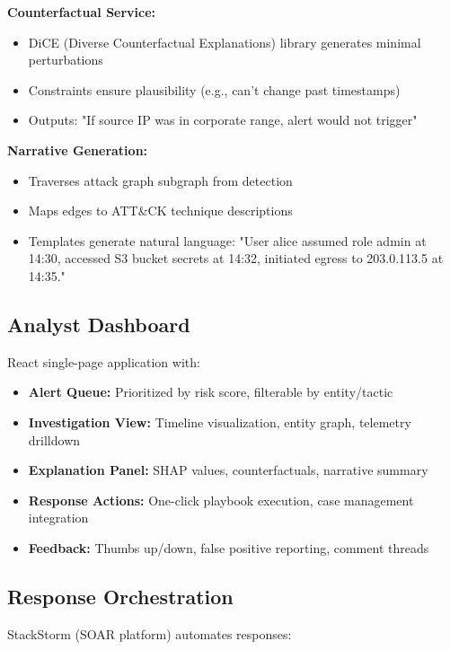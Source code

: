 \textbf{Counterfactual Service:}
\begin{itemize}
    \item DiCE (Diverse Counterfactual Explanations) library generates minimal perturbations
    \item Constraints ensure plausibility (e.g., can't change past timestamps)
    \item Outputs: "If source IP was in corporate range, alert would not trigger"
\end{itemize}

\textbf{Narrative Generation:}
\begin{itemize}
    \item Traverses attack graph subgraph from detection
    \item Maps edges to ATT\&CK technique descriptions
    \item Templates generate natural language: "User alice assumed role admin at 14:30, accessed S3 bucket secrets at 14:32, initiated egress to 203.0.113.5 at 14:35."
\end{itemize}

\subsection{Analyst Dashboard}
React single-page application with:
\begin{itemize}
    \item \textbf{Alert Queue:} Prioritized by risk score, filterable by entity/tactic
    \item \textbf{Investigation View:} Timeline visualization, entity graph, telemetry drilldown
    \item \textbf{Explanation Panel:} SHAP values, counterfactuals, narrative summary
    \item \textbf{Response Actions:} One-click playbook execution, case management integration
    \item \textbf{Feedback:} Thumbs up/down, false positive reporting, comment threads
\end{itemize}

\subsection{Response Orchestration}
StackStorm (SOAR platform) automates responses:

